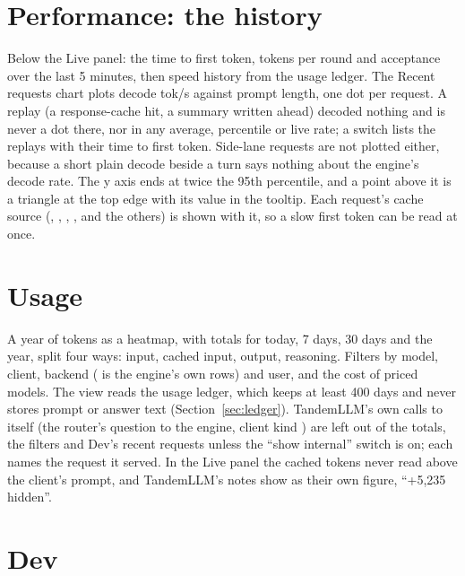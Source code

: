 \section{Performance: the history}

Below the Live panel: the time to first token, tokens per round and acceptance over the last 5 minutes, then speed history from the usage ledger. The Recent requests chart plots decode tok/s against prompt length, one dot per request. A replay (a response-cache hit, a summary written ahead) decoded nothing and is never a dot there, nor in any average, percentile or live rate; a switch lists the replays with their time to first token. Side-lane requests are not plotted either, because a short plain decode beside a turn says nothing about the engine's decode rate. The y axis ends at twice the 95th percentile, and a point above it is a triangle at the top edge with its value in the tooltip. Each request's cache source (, , , ,  and the others) is shown with it, so a slow first token can be read at once.

\section{Usage}

A year of tokens as a heatmap, with totals for today, 7 days, 30 days and the year, split four ways: input, cached input, output, reasoning. Filters by model, client, backend ( is the engine's own rows) and user, and the cost of priced models. The view reads the usage ledger, which keeps at least 400 days and never stores prompt or answer text (Section~\ref{sec:ledger}). TandemLLM's own calls to itself (the router's question to the engine, client kind ) are left out of the totals, the filters and Dev's recent requests unless the \enquote{show internal} switch is on; each names the request it served. In the Live panel the cached tokens never read above the client's prompt, and TandemLLM's notes show as their own figure, \enquote{+5,235 hidden}.


\section{Dev}

